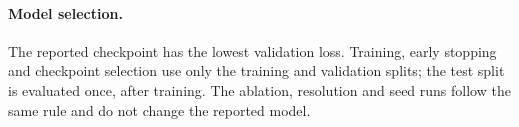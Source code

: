 \paragraph{Model selection.} The reported checkpoint has the lowest validation loss. Training, early stopping and checkpoint selection use only the training and validation splits; the test split is evaluated once, after training. The ablation, resolution and seed runs follow the same rule and do not change the reported model.
